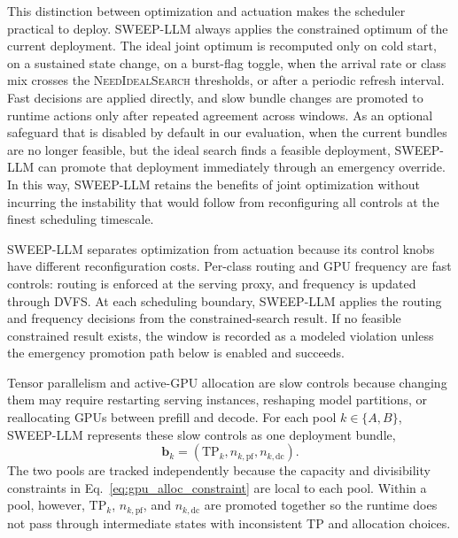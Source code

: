 This distinction between optimization and actuation makes the scheduler practical to deploy.
SWEEP-LLM always applies the constrained optimum of the current deployment.
The ideal joint optimum is recomputed only on cold start, on a sustained state change, on a burst-flag toggle, when the arrival rate or class mix crosses the \textsc{NeedIdealSearch} thresholds, or after a periodic refresh interval.
Fast decisions are applied directly, and slow bundle changes are promoted to runtime actions only after repeated agreement across windows.
As an optional safeguard that is disabled by default in our evaluation, when the current bundles are no longer feasible, but the ideal search finds a feasible deployment, SWEEP-LLM can promote that deployment immediately through an emergency override.
In this way, SWEEP-LLM retains the benefits of joint optimization without incurring the instability that would follow from reconfiguring all controls at the finest scheduling timescale.
\fi


SWEEP-LLM separates optimization from actuation because its control knobs have different reconfiguration costs.
Per-class routing and GPU frequency are fast controls: routing is enforced at the serving proxy, and frequency is updated through DVFS.
At each scheduling boundary, SWEEP-LLM applies the routing and frequency decisions from the constrained-search result.
If no feasible constrained result exists, the window is recorded as a modeled violation unless the emergency promotion path below is enabled and succeeds.

Tensor parallelism and active-GPU allocation are slow controls because changing them may require restarting serving instances, reshaping model partitions, or reallocating GPUs between prefill and decode.
For each pool $k\in\{A,B\}$, SWEEP-LLM represents these slow controls as one deployment bundle,
\begin{equation}
\mathbf{b}_k = (\mathrm{TP}_k,n_{k,\mathrm{pf}},n_{k,\mathrm{dc}}).
\label{eq:pool_bundle}
\end{equation}
The two pools are tracked independently because the capacity and divisibility constraints in Eq.~\ref{eq:gpu_alloc_constraint} are local to each pool.
Within a pool, however, $\mathrm{TP}_k$, $n_{k,\mathrm{pf}}$, and $n_{k,\mathrm{dc}}$ are promoted together so the runtime does not pass through intermediate states with inconsistent TP and allocation choices.

